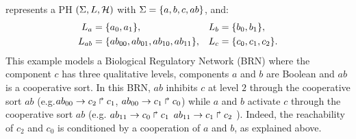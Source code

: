 \documentclass[11pt,a4paper,twoside]{epig}
\begin{document}
\begin{example}
 represents a PH $(\Sigma,L,\mathcal{H})$ with $\Sigma = \{a,b,c,ab\}$, and:
\begin{align*}
L_a &= \{a_0,a_1\},&
L_b &= \{b_0, b_1\},\\
L_{ab} &= \{ab_{00}, ab_{01}, ab_{10}, ab_{11}\},&
L_c &= \{c_0, c_1, c_2\}.
\end{align*}
This example models a Biological Regulatory Network (BRN) where the component $c$ has three qualitative levels, components $a$ and $b$ are Boolean and $ab$ is a cooperative sort.
In this BRN, $ab$ inhibits $c$ at level $2$ through the cooperative sort $ab$ (e.g.$ab_{00}\rightarrow c_2\Rsh c_1$, $ab_{00}\rightarrow c_1\Rsh c_0$) while $a$ and $b$ activate $c$  
through the cooperative sort $ab$ (e.g. $ab_{11}\rightarrow c_0\Rsh c_1$ $ab_{11}\rightarrow c_1\Rsh c_2$ ). Indeed, the reachability of $c_2$ and $c_0$ 
is conditioned by a cooperation of $a$ and $b$, as explained above.

\begin{figure}[ht]
\begin{minipage}{0.4\linewidth}
\centering
{}
\end{minipage}
\begin{minipage}{0.6\linewidth}
\centering
{}
\end{minipage}
\end{figure}
\end{example}
\end{document}
